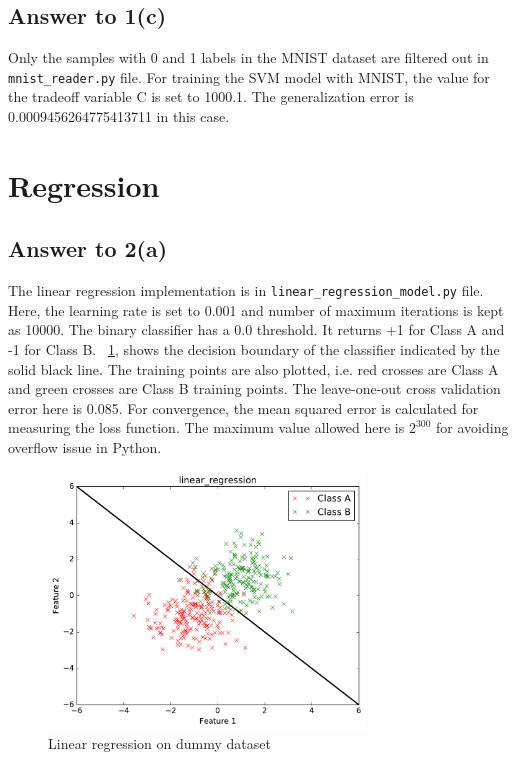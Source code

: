 \documentclass[runningheads]{llncs}
\begin{document}
\subsection{Answer to 1(c)}
Only the samples with 0 and 1 labels in the MNIST dataset are filtered out in \texttt{mnist\_reader.py} file.
For training the SVM model with MNIST, the value for the tradeoff variable C is set to 1000.1.
The generalization error is 0.0009456264775413711 in this case.

\section{Regression}

\subsection{Answer to 2(a)}
The linear regression implementation is in \texttt{linear\_regression\_model.py} file. Here, the learning rate is
set to 0.001 and number of maximum iterations is kept as 10000. The binary classifier has a 0.0 threshold.
It returns +1 for Class A and -1 for Class B. \figurename~\ref{fig:linear_dummy}, shows the decision boundary
of the classifier indicated by the solid black line. The training points are also plotted, i.e. red crosses are
Class A and green crosses are Class B training points. The leave-one-out cross validation error here is 0.085.
For convergence, the mean squared error is calculated for measuring the loss function. The maximum value
allowed here is $2^{300}$ for avoiding overflow issue in Python.
\begin{figure}
\centering
\includegraphics[width=0.75\textwidth]{linear_regression.pdf}
\caption{Linear regression on dummy dataset} \label{fig:linear_dummy}
\end{figure}
\end{document}
